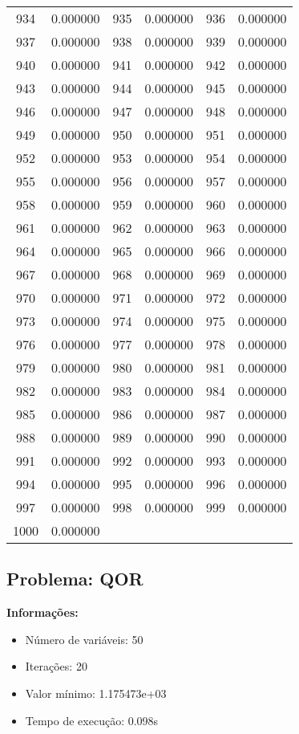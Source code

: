 \documentclass[12pt]{article}
\begin{document}
\begin{longtable}{@{}cc|cc|cc@{}}
934 & 0.000000 & 935 & 0.000000 & 936 & 0.000000 \\
937 & 0.000000 & 938 & 0.000000 & 939 & 0.000000 \\
940 & 0.000000 & 941 & 0.000000 & 942 & 0.000000 \\
943 & 0.000000 & 944 & 0.000000 & 945 & 0.000000 \\
946 & 0.000000 & 947 & 0.000000 & 948 & 0.000000 \\
949 & 0.000000 & 950 & 0.000000 & 951 & 0.000000 \\
952 & 0.000000 & 953 & 0.000000 & 954 & 0.000000 \\
955 & 0.000000 & 956 & 0.000000 & 957 & 0.000000 \\
958 & 0.000000 & 959 & 0.000000 & 960 & 0.000000 \\
961 & 0.000000 & 962 & 0.000000 & 963 & 0.000000 \\
964 & 0.000000 & 965 & 0.000000 & 966 & 0.000000 \\
967 & 0.000000 & 968 & 0.000000 & 969 & 0.000000 \\
970 & 0.000000 & 971 & 0.000000 & 972 & 0.000000 \\
973 & 0.000000 & 974 & 0.000000 & 975 & 0.000000 \\
976 & 0.000000 & 977 & 0.000000 & 978 & 0.000000 \\
979 & 0.000000 & 980 & 0.000000 & 981 & 0.000000 \\
982 & 0.000000 & 983 & 0.000000 & 984 & 0.000000 \\
985 & 0.000000 & 986 & 0.000000 & 987 & 0.000000 \\
988 & 0.000000 & 989 & 0.000000 & 990 & 0.000000 \\
991 & 0.000000 & 992 & 0.000000 & 993 & 0.000000 \\
994 & 0.000000 & 995 & 0.000000 & 996 & 0.000000 \\
997 & 0.000000 & 998 & 0.000000 & 999 & 0.000000 \\
1000 & 0.000000 &  &  &  &  \\

\end{longtable}


\newpage            
\subsection{Problema: QOR}

\textbf{Informações:}
\begin{itemize}
\item Número de variáveis: 50
\item Iterações: 20
\item Valor mínimo: 1.175473e+03
\item Tempo de execução: 0.098s
\end{itemize}
\end{document}
